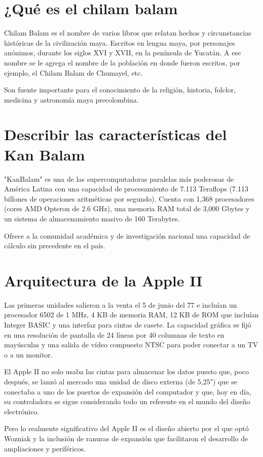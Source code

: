 \documentclass{mylib/reporte}
\begin{document}
\section{¿Qué es el chilam balam}

Chilam Balam es el nombre de varios libros que relatan hechos y circunstancias históricas de la civilización maya. Escritos en lengua maya, por personajes anónimos, durante los siglos XVI y XVII, en la península de Yucatán. A ese nombre se le agrega el nombre de la población en donde fueron escritos, por ejemplo, el Chilam Balam de Chumayel, etc.

Son fuente importante para el conocimiento de la religión, historia, folclor, medicina y astronomía maya precolombina.

\section{Describir las características del Kan Balam}
"KanBalam" es una de las supercomputadoras paralelas más poderosas de América Latina con una capacidad de procesamiento de 7.113 Teraflops (7.113 billones de operaciones aritméticas por segundo). Cuenta con 1,368 procesadores (cores AMD Opteron de 2.6 GHz), una memoria RAM total de 3,000 Gbytes y un sistema de almacenamiento masivo de 160 Terabytes.

Ofrece a la comunidad académica y de investigación nacional una capacidad de cálculo sin precedente en el país.

\section{Arquitectura de la Apple II}
Las primeras unidades salieron a la venta el 5 de junio del 77 e incluían un procesador 6502 de 1 MHz, 4 KB de memoria RAM, 12 KB de ROM que incluían Integer BASIC y una interfaz para cintas de casete. La capacidad gráfica se fijó en una resolución de pantalla de 24 líneas por 40 columnas de texto en mayúsculas y una salida de vídeo compuesto NTSC para poder conectar a un TV o a un monitor.

El Apple II no solo usaba las cintas para almacenar los datos puesto que, poco después, se lanzó al mercado una unidad de disco externa (de 5,25") que se conectaba a uno de los puertos de expansión del computador y que, hoy en día, su controladora se sigue considerando todo un referente en el mundo del diseño electrónico.

Pero lo realmente significativo del Apple II es el diseño abierto por el que optó Wozniak y la inclusión de ranuras de expansión que facilitaron el desarrollo de ampliaciones y periféricos.
\end{document}
